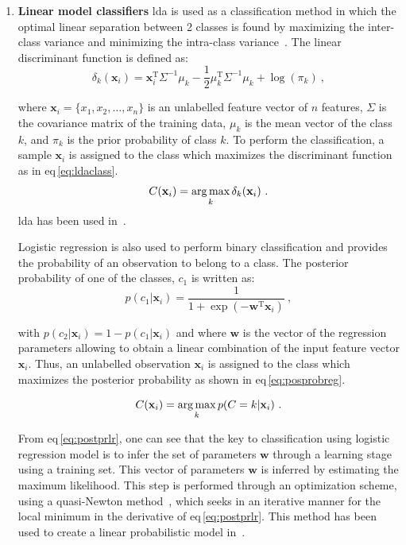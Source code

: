 \begin{enumerate}[leftmargin=*]
\item[] \textbf{Linear model classifiers}
  \Acf{lda} is used as a classification method in which the optimal linear
  separation between 2 classes is found by maximizing the inter-class variance
  and minimizing the intra-class variance~\cite{Friedman1989}.
  The linear discriminant function is defined as:
  \begin{equation}
    \delta_{k}(\mathbf{x}_i) = \mathbf{x}_i^{\text{T}} \Sigma^{-1} \mu_k - \frac{1}{2} \mu_{k}^{\text{T}} \Sigma^{-1} \mu_k + \log (\pi_k) \ ,
    \label{eq:ldafun}
  \end{equation}

  \noindent where $\mathbf{x}_i = \{x_1, x_2, \dots , x_n\}$ is an unlabelled
  feature vector of $n$ features, $\Sigma$ is the covariance matrix of the
  training data, $\mu_k$ is the mean vector of the class $k$, and $\pi_k$ is
  the prior probability of class $k$.
  To perform the classification, a sample $\mathbf{x}_i$ is assigned to the
  class which maximizes the discriminant function as in
  \acs{eq}\,\eqref{eq:ldaclass}.
  \begin{equation}
    C(\mathbf{x}_i) = \operatorname*{arg\,max}_k \delta_k(\mathbf{x}_i) \ .
    \label{eq:ldaclass}
  \end{equation}
  \Ac{lda} has been used in~\cite{Antic2013,Chan2003,Niaf2011,Niaf2012,Vos2012}.

  Logistic regression is also used to perform binary classification and
  provides the probability of an observation to belong to a class.
  The posterior probability of one of the classes, $c_1$ is written as:
  \begin{equation}
    p(c_1|\mathbf{x}_i) = \frac{1}{1+\exp(-\mathbf{w}^{\text{T}}\mathbf{x}_i)} \ ,
    \label{eq:postprlr}
  \end{equation}

  \noindent with $p(c_2|\mathbf{x}_i) = 1 - p(c_1|\mathbf{x}_i)$ and where
  $\mathbf{w}$ is the vector of the regression parameters allowing to obtain a
  linear combination of the input feature vector $\mathbf{x}_i$.
  Thus, an unlabelled observation $\mathbf{x}_i$ is assigned to the class which
  maximizes the posterior probability as shown in
  \acs{eq}\,\eqref{eq:posprobreg}.

  \begin{equation}
    C(\mathbf{x}_i) = \operatorname*{arg\,max}_k p(C=k|\mathbf{x}_i) \ .
    \label{eq:posprobreg}
  \end{equation}

  From \acs{eq}\,\eqref{eq:postprlr}, one can see that the key to
  classification using logistic regression model is to infer the set of
  parameters $\mathbf{w}$ through a learning stage using a training set.
  This vector of parameters $\mathbf{w}$ is inferred by estimating the maximum
  likelihood.
  This step is performed through an optimization scheme, using a quasi-Newton
  method~\cite{Byrd1995}, which seeks in an iterative manner for the local
  minimum in the derivative of \acs{eq}\,\eqref{eq:postprlr}.
  This method has been used to create a linear probabilistic model
  in~\cite{Kelm2007,Puech2009,lehaire2014computer,rampun2015computer}.


\end{enumerate}
